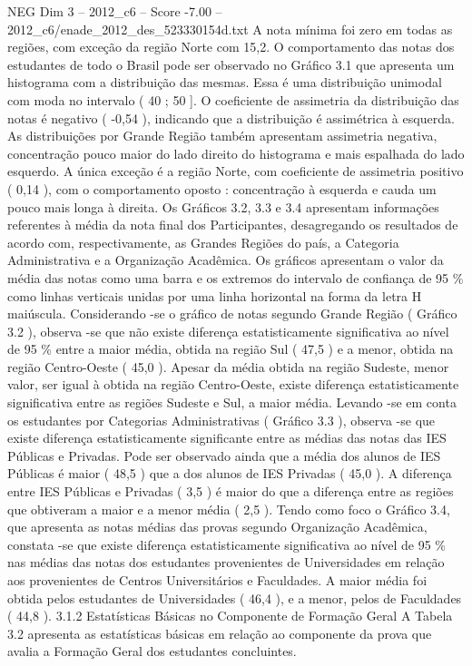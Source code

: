 \begin{textsample}{NEG Dim 3 – 2012\_c6 – Score -7.00 – 2012\_c6/enade\_2012\_des\_523330154d.txt}
A nota mínima foi zero em todas as regiões, com exceção da região Norte com 15,2.
O comportamento das notas dos estudantes de todo o Brasil pode ser observado no Gráfico 3.1 que apresenta um histograma com a distribuição das mesmas.
Essa é uma distribuição unimodal com moda no intervalo ( 40 ; 50 ].
O coeficiente de assimetria da distribuição das notas é negativo ( -0,54 ), indicando que a distribuição é assimétrica à esquerda.
As distribuições por Grande Região também apresentam assimetria negativa, concentração pouco maior do lado direito do histograma e mais espalhada do lado esquerdo.
A única exceção é a região Norte, com coeficiente de assimetria positivo ( 0,14 ), com o comportamento oposto : concentração à esquerda e cauda um pouco mais longa à direita.
Os Gráficos 3.2, 3.3 e 3.4 apresentam informações referentes à média da nota final dos Participantes, desagregando os resultados de acordo com, respectivamente, as Grandes Regiões do país, a Categoria Administrativa e a Organização Acadêmica.
Os gráficos apresentam o valor da média das notas como uma barra e os extremos do intervalo de confiança de 95 \% como linhas verticais unidas por uma linha horizontal na forma da letra H maiúscula.
Considerando -se o gráfico de notas segundo Grande Região ( Gráfico 3.2 ), observa -se que não existe diferença estatisticamente significativa ao nível de 95 \% entre a maior média, obtida na região Sul ( 47,5 ) e a menor, obtida na região Centro-Oeste ( 45,0 ).
Apesar da média obtida na região Sudeste, menor valor, ser igual à obtida na região Centro-Oeste, existe diferença estatisticamente significativa entre as regiões Sudeste e Sul, a maior média.
Levando -se em conta os estudantes por Categorias Administrativas ( Gráfico 3.3 ), observa -se que existe diferença estatisticamente significante entre as médias das notas das IES Públicas e Privadas.
Pode ser observado ainda que a média dos alunos de IES Públicas é maior ( 48,5 ) que a dos alunos de IES Privadas ( 45,0 ).
A diferença entre IES Públicas e Privadas ( 3,5 ) é maior do que a diferença entre as regiões que obtiveram a maior e a menor média ( 2,5 ).
Tendo como foco o Gráfico 3.4, que apresenta as notas médias das provas segundo Organização Acadêmica, constata -se que existe diferença estatisticamente significativa ao nível de 95 \% nas médias das notas dos estudantes provenientes de Universidades em relação aos provenientes de Centros Universitários e Faculdades.
A maior média foi obtida pelos estudantes de Universidades ( 46,4 ), e a menor, pelos de Faculdades ( 44,8 ). 3.1.2 Estatísticas Básicas no Componente de Formação Geral A Tabela 3.2 apresenta as estatísticas básicas em relação ao componente da prova que avalia a Formação Geral dos estudantes concluintes.

\end{textsample}

